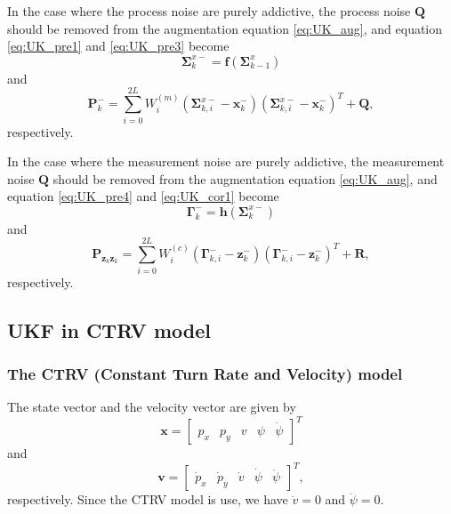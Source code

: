 \documentclass[12pt]{article}
\begin{document}
In the case where the process noise are purely addictive, the process noise \(\mathbf{Q}\) should be removed from the augmentation equation \ref{eq:UK_aug}, and equation \ref{eq:UK_pre1} and \ref{eq:UK_pre3} become
\begin{equation}
	\mathbf{\Sigma}_k^{x-} = \mathbf{f}( \mathbf{\Sigma}^x_{k-1})
\end{equation}
and
\begin{equation}
	\mathbf{P}_{k}^{-} = \sum_{i=0}^{2L}{W_i^{(m)}(\mathbf{\Sigma}^{x-}_{k,i} - 		\mathbf{x}_k^{-})(\mathbf{\Sigma}^{x-}_{k,i} - \mathbf{x}_k^{-})^T} + \mathbf{Q} ,
\end{equation}
respectively.

In the case where the measurement noise are purely addictive, the measurement noise \(\mathbf{Q}\) should be removed from the augmentation equation \ref{eq:UK_aug}, and equation \ref{eq:UK_pre4} and \ref{eq:UK_cor1} become
\begin{equation} \label{eq:UKF_mea_add0}
	\mathbf{\Gamma}_k^- = \mathbf{h}(\mathbf{\Sigma}_k^{x-})
\end{equation}
and
\begin{equation} \label{eq:UKF_mea_add1}
	\mathbf{P}_{\mathbf{z}_k \mathbf{z}_k} = \sum_{i=0}^{2L}{W_i^{(c)}(\mathbf{\Gamma}^{-}_{k,i} - \mathbf{z}_k^{-})(\mathbf{\Gamma}^{-}_{k,i} - \mathbf{z}_k^{-})^T} + \mathbf{R},
\end{equation}
respectively.

\subsection{UKF in CTRV model}

\subsubsection{The CTRV (Constant Turn Rate and Velocity) model}

The state vector and the velocity vector are given by
\begin{equation}
	\mathbf{x} = \begin{bmatrix}p_x & p_y & v & \psi & \dot{\psi}\end{bmatrix}^T 
\end{equation}
%
and
%
\begin{equation}
	\mathbf{v} = \begin{bmatrix}\dot{p}_x & \dot{p}_y & \dot{v} & \dot{\psi} & \ddot{\psi}\end{bmatrix}^T, 
\end{equation}
%
respectively. Since the CTRV model is use, we have $\dot{v}=0$ and $\ddot{\psi}=0$.
\end{document}

